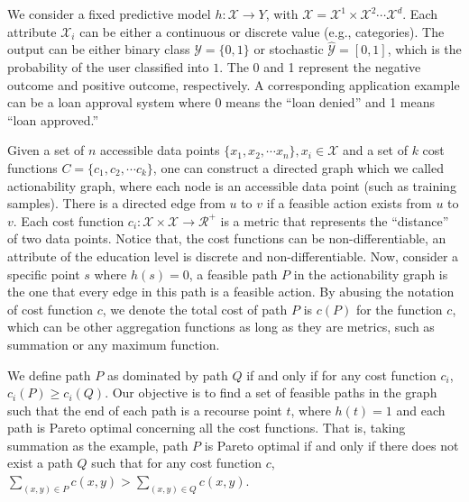 We consider a fixed predictive model $h: \mathcal{X} \rightarrow Y$, with $\mathcal{X}= \mathcal{X}^1 \times \mathcal{X}^2 \cdots \mathcal{X}^d$. Each attribute $\mathcal{X}_i$ can be either a continuous or discrete value (e.g., categories). The output can be either binary class $\mathcal{Y}=\{0,1\}$ or stochastic $\hat{\mathcal{Y}}=[0,1]$, which is the probability of the user classified into $1$. The 0 and 1 represent the negative outcome and positive outcome, respectively. A corresponding application example can be a loan approval system where 0 means the ``loan denied'' and 1 means ``loan approved.''

Given a set of $n$ accessible data points $\{x_1,x_2, \cdots x_n \}, x_i \in \mathcal{X}$ and a set of $k$ cost functions $C=\{c_1,c_2, \cdots c_k\}$, one can construct a directed graph which we called actionability graph, where each node is an accessible data point (such as training samples). There is a directed edge from $u$ to $v$ if a feasible action exists from $u$ to $v$. Each cost function $c_i: \mathcal{X} \times \mathcal{X} \rightarrow \mathcal{R}^+$ is a metric that represents the ``distance'' of two data points. Notice that, the cost functions can be non-differentiable, an attribute of the education level is discrete and non-differentiable. Now, consider a specific point $s$ where $h(s)=0$, a feasible path $P$ in the actionability graph is the one that every edge in this path is a feasible action. By abusing the notation of cost function $c$, we denote the total cost of path $P$ is $c(P)$ for the function $c$, which can be other aggregation functions as long as they are metrics, such as summation or any maximum function. 

We define path $P$ as dominated by path $Q$ if and only if for any cost function $c_i$, $c_i(P) \geq c_i(Q)$. Our objective is to find a set of feasible paths in the graph such that the end of each path is a recourse point $t$, where $h(t)=1$ and each path is Pareto optimal concerning all the cost functions. That is, taking summation as the example, path $P$ is Pareto optimal if and only if there does not exist a path $Q$ such that for any cost function $c$, $\sum_{(x,y) \in P} c(x,y) > \sum_{(x,y) \in Q} c(x,y)$.